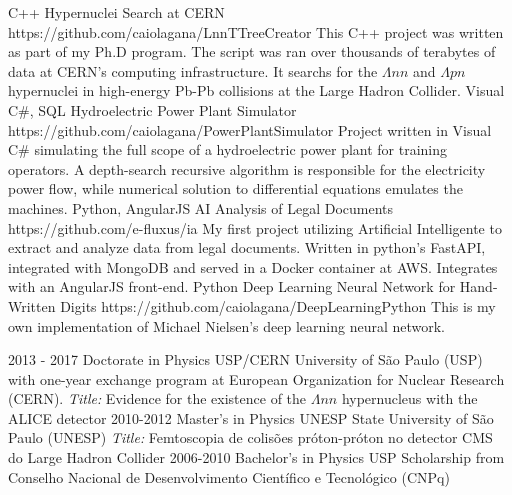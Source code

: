 \documentclass[9pt]{developercv} %
\begin{document}

\vspace{10 pt}
\begin{entrylist}
	\entry
		{C++}
		{Hypernuclei Search at CERN}
		{https://github.com/caiolagana/LnnTTreeCreator}
		{This C++ project was written as part of my Ph.D program. The script was ran over thousands of terabytes of data at CERN's computing infrastructure. It searchs for the $\Lambda nn$ and $\Lambda pn$ hypernuclei in high-energy Pb-Pb collisions at the Large Hadron Collider.}
    \entry
		{Visual C\#, SQL}
		{Hydroelectric Power Plant Simulator}
		{https://github.com/caiolagana/PowerPlantSimulator}
		{Project written in Visual C\# simulating the full scope of a hydroelectric power plant for training operators. A depth-search recursive algorithm is responsible for the electricity power flow, while numerical solution to differential equations emulates the machines.}
    \entry
		{Python, AngularJS}
		{AI Analysis of Legal Documents}
		{https://github.com/e-fluxus/ia}
		{My first project utilizing Artificial Intelligente to extract and analyze data from legal documents. Written in python's FastAPI, integrated with MongoDB and served in a Docker container at AWS. Integrates with an AngularJS front-end.}
		\entry
		{Python}
		{Deep Learning Neural Network for Hand-Written Digits}
		{https://github.com/caiolagana/DeepLearningPython}
		{This is my own implementation of Michael Nielsen's deep learning neural network.}
\end{entrylist}


\vspace{-10 pt}
\begin{entrylist}
    \entry
		{2013 - 2017}
		{Doctorate in Physics}
		{USP/CERN}
		{University of São Paulo (USP) with one-year exchange program at European Organization for Nuclear Research (CERN). {\it Title:} Evidence for the existence of the $\Lambda nn$ hypernucleus with the ALICE detector}
    \entry
		{2010-2012}
		{Master's in Physics}
		{UNESP}
		{State University of São Paulo (UNESP) {\it Title:} Femtoscopia de colisões próton-próton no detector CMS do Large Hadron Collider}
	\entry
		{2006-2010}
		{Bachelor's in Physics}
		{USP}
		{Scholarship from Conselho Nacional de Desenvolvimento Científico e Tecnológico (CNPq)}
\end{entrylist}
\end{document}
